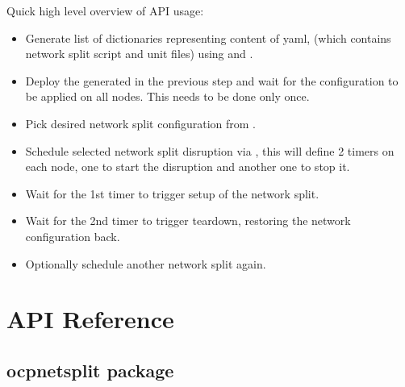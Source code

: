 \documentclass[letterpaper,10pt,english]{sphinxmanual}
\begin{document}
Quick high level overview of API usage:
\begin{itemize}
\item {} 
Generate list of dictionaries representing content of  yaml,
(which contains network split script and unit files) using
{\hyperref[\detokenize{ocpnetsplit:ocpnetsplit.main.get_zone_config}]{}} and
{\hyperref[\detokenize{ocpnetsplit:ocpnetsplit.main.get_networksplit_mc_spec}]{}}.

\item {} 
Deploy the  generated in the previous step and wait for the
configuration to be applied on all nodes. This needs to be done only once.

\item {} 
Pick desired network split configuration from
{\hyperref[\detokenize{ocpnetsplit:ocpnetsplit.zone.NETWORK_SPLITS}]{}}.

\item {} 
Schedule selected network split disruption via
{\hyperref[\detokenize{ocpnetsplit:ocpnetsplit.main.schedule_split}]{}}, this will define 2 timers
on each node, one to start the disruption and another one to stop it.

\item {} 
Wait for the 1st timer to trigger setup of the network split.

\item {} 
Wait for the 2nd timer to trigger teardown, restoring the network
configuration back.

\item {} 
Optionally schedule another network split again.

\end{itemize}


\chapter{API Reference}
\label{\detokenize{modules:api-reference}}\label{\detokenize{modules::doc}}

\section{ocpnetsplit package}
\label{\detokenize{ocpnetsplit:ocpnetsplit-package}}\label{\detokenize{ocpnetsplit::doc}}
\end{document}
